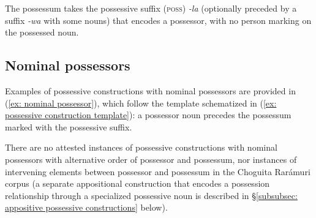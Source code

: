 The possessum takes the possessive suffix (\textsc{poss}) \textit{-la} (optionally preceded by a suffix \textit{-wa} with some nouns) that encodes a possessor, with no person marking on the possessed noun.

\subsection{Nominal possessors}
\label{subsubsec: nominal possessors}

Examples of possessive constructions with nominal possessors are provided in (\ref{ex: nominal possessor}), which follow the template schematized in (\ref{ex: possessive construction template}): a possessor noun precedes the possessum marked with the possessive suffix.

\ea\label{ex: nominal possessor}

    \z
\z

There are no attested instances of possessive constructions with nominal possessors with alternative order of possessor and possessum, nor instances of intervening elements between possessor and possessum in the Choguita Rarámuri corpus (a separate appositional construction that encodes a possession relationship through a specialized possessive noun is described in §\ref{subsubsec: appositive possessive constructions} below).

